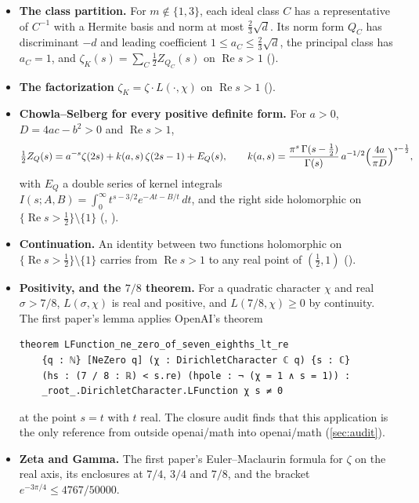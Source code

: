 \documentclass[11pt]{article}
\theoremstyle{definition}
\newcommand{\re}{\operatorname{Re}}
\begin{document}
\begin{itemize}
\item \textbf{The class partition.} For $m \notin \{1, 3\}$, each ideal class $C$ has a representative of $C^{-1}$ with a Hermite basis and norm at most $\frac23\sqrt d$. Its norm form $Q_C$ has discriminant $-d$ and leading coefficient $1 \le a_C \le \frac23\sqrt d$, the principal class has $a_C = 1$, and $\zeta_K(s) = \sum_C \frac12 Z_{Q_C}(s)$ on $\re s > 1$ ().
\item \textbf{The factorization} $\zeta_K = \zeta\cdot L(\cdot,\chi)$ on $\re s > 1$ ().
\item \textbf{Chowla--Selberg for every positive definite form.} For $a > 0$, $D = 4ac - b^2 > 0$ and $\re s > 1$,
\begin{equation}\label{eq:cs}
\tfrac12 Z_Q(s) = a^{-s}\zeta(2s) + k(a,s)\,\zeta(2s-1) + E_Q(s), \qquad k(a,s) = \frac{\pi^s\,\Gamma(s - \frac12)}{\Gamma(s)}\,a^{-1/2}\Bigl(\frac{4a}{\pi D}\Bigr)^{s-\frac12},
\end{equation}
with $E_Q$ a double series of kernel integrals $I(s;A,B) = \int_0^\infty t^{s-3/2}e^{-At-B/t}\,dt$, and the right side holomorphic on $\{\re s > \frac12\}\setminus\{1\}$ (, ).
\item \textbf{Continuation.} An identity between two functions holomorphic on $\{\re s > \frac12\}\setminus\{1\}$ carries from $\re s > 1$ to any real point of $(\frac12, 1)$ ().
\item \textbf{Positivity, and the $7/8$ theorem.} For a quadratic character $\chi$ and real $\sigma > 7/8$, $L(\sigma,\chi)$ is real and positive, and $L(7/8,\chi) \ge 0$ by continuity. The first paper's lemma  applies OpenAI's theorem
\begin{lstlisting}
theorem LFunction_ne_zero_of_seven_eighths_lt_re
    {q : ℕ} [NeZero q] (χ : DirichletCharacter ℂ q) {s : ℂ}
    (hs : (7 / 8 : ℝ) < s.re) (hpole : ¬ (χ = 1 ∧ s = 1)) :
    _root_.DirichletCharacter.LFunction χ s ≠ 0
\end{lstlisting}
at the point $s = t$ with $t$ real. The closure audit finds that this application is the only reference from outside openai/math into openai/math (\cref{sec:audit}).
\item \textbf{Zeta and Gamma.} The first paper's Euler--Maclaurin formula for $\zeta$ on the real axis, its enclosures at $7/4$, $3/4$ and $7/8$, and the bracket $e^{-3\pi/4} \le 4767/50000$.
\end{itemize}
\end{document}
